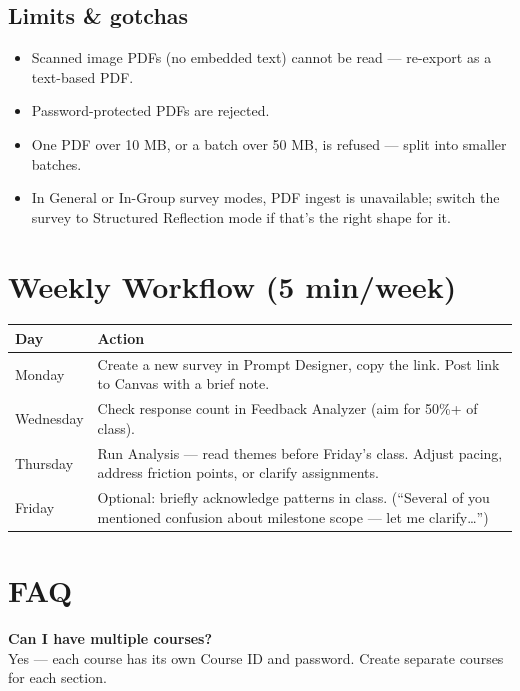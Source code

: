 \documentclass[11pt, letterpaper]{article}
\begin{document}
\subsection{Limits \& gotchas}

\begin{itemize}[nosep]
    \item Scanned image PDFs (no embedded text) cannot be read --- re-export as a text-based PDF.
    \item Password-protected PDFs are rejected.
    \item One PDF over 10 MB, or a batch over 50 MB, is refused --- split into smaller batches.
    \item In General or In-Group survey modes, PDF ingest is unavailable; switch the survey to Structured Reflection mode if that's the right shape for it.
\end{itemize}

\FloatBarrier  %

\section{Weekly Workflow (5 min/week)}

\begin{table}[h!]
\centering
\begin{tabular}{@{}lp{10cm}@{}}
\toprule
\textbf{Day} & \textbf{Action} \\
\midrule
Monday & Create a new survey in Prompt Designer, copy the link. Post link to Canvas with a brief note. \\
Wednesday & Check response count in Feedback Analyzer (aim for 50\%+ of class). \\
Thursday & Run Analysis --- read themes before Friday's class. Adjust pacing, address friction points, or clarify assignments. \\
Friday & Optional: briefly acknowledge patterns in class. (``Several of you mentioned confusion about milestone scope --- let me clarify\ldots'') \\
\bottomrule
\end{tabular}
\end{table}

\section{FAQ}

\textbf{Can I have multiple courses?}\\
Yes --- each course has its own Course ID and password. Create separate courses for each section.
\end{document}
